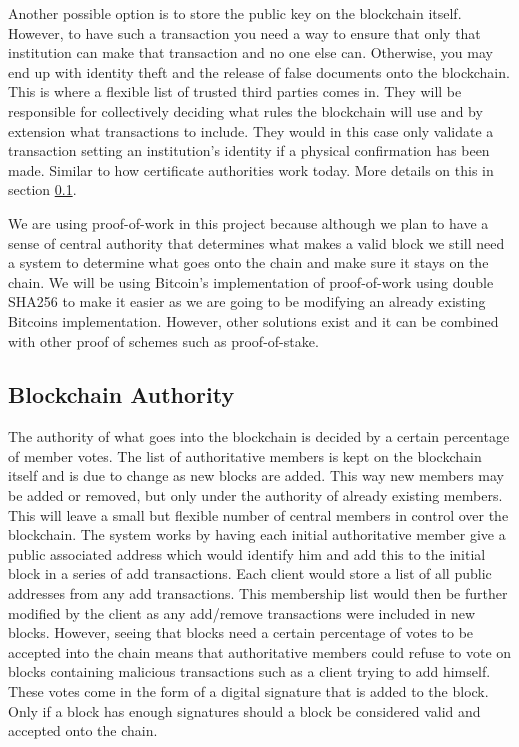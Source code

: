 \documentclass[12pt]{article}
\begin{document}
Another possible option is to store the public key on the blockchain itself. However, to have such a transaction you need a way to ensure that only that institution can make that transaction and no one else can. Otherwise, you may end up with identity theft and the release of false documents onto the blockchain. This is where a flexible list of trusted third parties comes in. They will be responsible for collectively deciding what rules the blockchain will use and by extension what transactions to include. They would in this case only validate a transaction setting an institution's identity if a physical confirmation has been made. Similar to how certificate authorities work today. More details on this in section \ref{subsec:authority}.


We are using proof-of-work in this project because although we plan to have a sense of central authority that determines what makes a valid block we still need a system to determine what goes onto the chain and make sure it stays on the chain. We will be using Bitcoin's implementation of proof-of-work using double SHA256 to make it easier as we are going to be modifying an already existing Bitcoins implementation. However, other solutions exist and it can be combined with other proof of schemes such as proof-of-stake.

\subsection{Blockchain Authority}\label{subsec:authority}

The authority of what goes into the blockchain is decided by a certain percentage of member votes. The list of authoritative members is kept on the blockchain itself and is due to change as new blocks are added. This way new members may be added or removed, but only under the authority of already existing members. This will leave a small but flexible number of central members in control over the blockchain. The system works by having each initial authoritative member give a public associated address which would identify him and add this to the initial block in a series of add transactions. Each client would store a list of all public addresses from any add transactions. This membership list would then be further modified by the client as any add/remove transactions were included in new blocks. However, seeing that blocks need a certain percentage of votes to be accepted into the chain means that authoritative members could refuse to vote on blocks containing malicious transactions such as a client trying to add himself. These votes come in the form of a digital signature that is added to the block. Only if a block has enough signatures should a block be considered valid and accepted onto the chain. 
\end{document}
